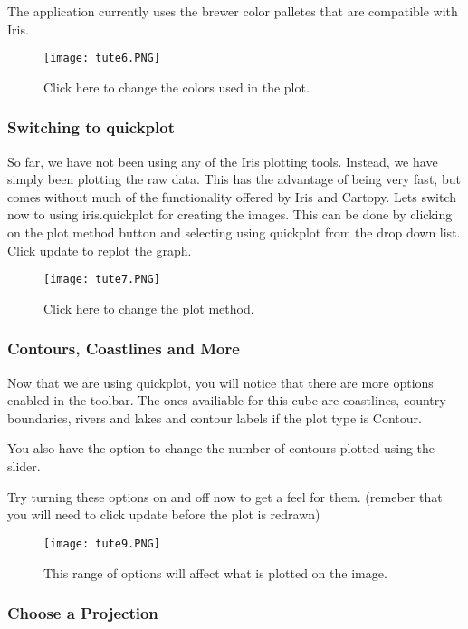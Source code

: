 \documentclass[a4paper,12pt]{article}
\begin{document}
The application currently uses the brewer color palletes that are compatible
with Iris.

\begin{figure}[H]
\centering
\texttt{[image: tute6.PNG]}
\caption{Click here to change the colors used in the plot.}

\label{overflow}
\end{figure}

\subsubsection{Switching to quickplot}

So far, we have not been using any of the Iris plotting tools. Instead, we have
simply been plotting the raw data. This has the advantage of being very fast,
but comes without much of the functionality offered by Iris and Cartopy. Lets
switch now to using iris.quickplot for creating the images. This can be done
by clicking on the plot method button and selecting using quickplot from the
drop down list. Click update to replot the graph.

\begin{figure}[H]
\centering
\texttt{[image: tute7.PNG]}
\caption{Click here to change the plot method.}
\label{overflow}
\end{figure}

\subsubsection{Contours, Coastlines and More}

Now that we are using quickplot, you will notice that there are more options
enabled in the toolbar. The ones
availiable for this cube are coastlines, country boundaries, rivers and lakes
and contour labels if the plot type is Contour.

You also have the option to change the number of contours plotted using the
slider.

Try turning these options on and off now to get a feel for them.
(remeber that you will need to click update before the plot is redrawn)

\begin{figure}[H]
\centering
\texttt{[image: tute9.PNG]}
\caption{This range of options will affect what is plotted on the image.}
\label{overflow}
\end{figure}


\subsubsection{Choose a Projection}
\end{document}
